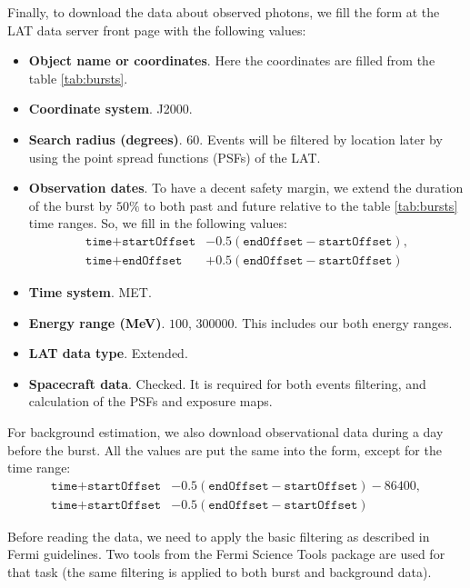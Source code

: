 \documentclass{article}
\begin{document}
Finally, to download the data about observed photons, we fill the form at the LAT data server front page with the following values:
\begin{itemize}
	\item{
		{\bf Object name or coordinates}.
		Here the coordinates are filled from the table \ref{tab:bursts}.
	}
	\item{
		{\bf Coordinate system}.
		J2000.
	}
	\item{
		{\bf Search radius (degrees)}.
		$60$.
		Events will be filtered by location later by using the point spread functions (PSFs) of the LAT.
	}
	\item{
		{\bf Observation dates}.
		To have a decent safety margin, we extend the duration of the burst by $50\%$ to both past and future relative to the table \ref{tab:bursts} time ranges.
		So, we fill in the following values:
		\begin{align*}
			\texttt{time} + \texttt{startOffset} &- 0.5\left(\texttt{endOffset}-\texttt{startOffset}\right),\\
			\texttt{time} + \texttt{endOffset} &+ 0.5\left(\texttt{endOffset}-\texttt{startOffset}\right)
		\end{align*}
	}
	\item{
		{\bf Time system}.
		MET.
	}
	\item{
		{\bf Energy range (MeV)}.
		$100,\,300000$.
		This includes our both energy ranges.
	}
	\item{
		{\bf LAT data type}.
		Extended.
	}
	\item{
		{\bf Spacecraft data}.
		Checked.
		It is required for both events filtering, and calculation of the PSFs and exposure maps.
	}
\end{itemize}

For background estimation, we also download observational data during a day before the burst.
All the values are put the same into the form, except for the time range:
\begin{align*}
	\texttt{time} + \texttt{startOffset} &- 0.5\left(\texttt{endOffset} - \texttt{startOffset}\right) - 86400,\\
	\texttt{time} + \texttt{startOffset} &- 0.5\left(\texttt{endOffset} - \texttt{startOffset}\right)
\end{align*}

Before reading the data, we need to apply the basic filtering as described in Fermi guidelines.
Two tools from the Fermi Science Tools package are used for that task (the same filtering is applied to both burst and background data).
\end{document}
